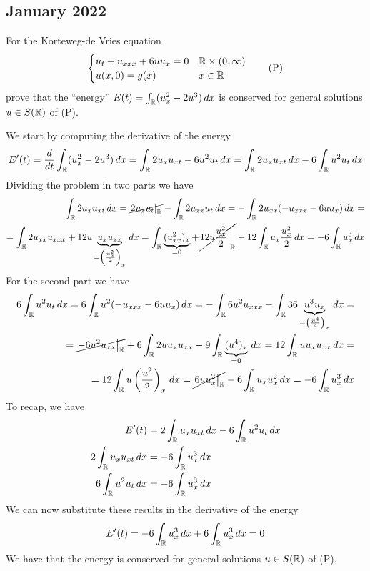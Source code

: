 \subsection{January 2022}
\begin{exercise}
    For the Korteweg-de Vries equation
    \[
        \begin{cases}
            u_t + u_{xxx} + 6 u u_x = 0 & \mathbb{R} \times (0, \infty) \\
            u(x, 0) = g(x) & x \in \mathbb{R}
        \end{cases}
        \tag*{(P)}
    \]
    prove that the ``energy'' \(E(t) = \int_{\mathbb{R}} (u_x^2 - 2 u^3) \, dx\) is conserved for general solutions \(u \in S(\mathbb{R})\) of (P).
\end{exercise}
We start by computing the derivative of the energy
\[
    \begin{split}
        E'(t) = \frac{d}{dt} \int_{\mathbb{R}} (u_x^2 - 2 u^3) \, dx = \int_{\mathbb{R}} 2 u_x u_{xt} - 6 u^2 u_t \, dx = \int_{\mathbb{R}} 2 u_x u_{xt} \, dx - 6 \int_{\mathbb{R}} u^2 u_t \, dx
    \end{split}
\]
Dividing the problem in two parts we have
\[
    \begin{split}
        \int_{\mathbb{R}} 2 u_x u_{xt} \, dx = \cancel{\left.2 u_x u_t \right|_{\mathbb{R}}} - \int_{\mathbb{R}} 2u_{xx} u_t \, dx = - \int_{\mathbb{R}} 2u_{xx} ( - u_{xxx} - 6 u u_x) \, dx = \\
        = \int_{\mathbb{R}} 2u_{xx} u_{xxx} + 12 u \underbrace{u_x u_{xx}}_{=\left(\frac{u_x^2}{2}\right)_x} \, dx = \int_{\mathbb{R}} \underbrace{(u_{xx}^2)_x}_{=0} + \cancel{\left. 12 u \frac{u_x^2}{2} \right|_{\mathbb{R}}} - 12 \int_{\mathbb{R}} u_x \frac{u_x^2}{2} \, dx = - 6 \int_{\mathbb{R}} u_x^3 \, dx
    \end{split}
\]
For the second part we have
\[
    \begin{split}
        6 \int_{\mathbb{R}} u^2 u_t \, dx = 6 \int_{\mathbb{R}} u^2 (-u_{xxx} - 6 u u_x) \, dx = -\int_{\mathbb{R}} 6 u^2 u_{xxx} - \int_{\mathbb{R}} 36 \underbrace{u^3 u_x}_{=\left(\frac{u^4}{4}\right)_x} \, dx = \\ 
        = \cancel{\left. - 6 u^2 u_{xx} \right|_{\mathbb{R}}} + 6 \int_{\mathbb{R}} 2 u u_{x} u_{xx} - 9 \int_{\mathbb{R}} \underbrace{(u^4)_x}_{=0} \, dx = 12 \int_{\mathbb{R}} u u_x u_{xx} \, dx = \\
        =12 \int_{\mathbb{R}} u\left(\frac{u^2}{2}\right)_x \, dx = \cancel{\left. 6 u u_x^2 \right|_{\mathbb{R}}} - 6 \int_{\mathbb{R}} u_x u^2_x \, dx = - 6 \int_{\mathbb{R}} u_x^3 \, dx
    \end{split}
\]
To recap, we have
\begin{align*}
    E'(t) &= 2\int_{\mathbb{R}} u_x u_{xt} \, dx - 6 \int_{\mathbb{R}} u^2 u_t \, dx  \\
    2\int_{\mathbb{R}}  u_x u_{xt} \, dx &= - 6 \int_{\mathbb{R}} u_x^3 \, dx \\
    6\int_{\mathbb{R}}  u^2 u_t \, dx &= - 6 \int_{\mathbb{R}} u_x^3 \, dx
\end{align*} 
We can now substitute these results in the derivative of the energy
\[
    \begin{split}
        E'(t) = - 6 \int_{\mathbb{R}} u_x^3 \, dx + 6 \int_{\mathbb{R}} u_x^3 \, dx = 0
    \end{split}
\]
We have that the energy is conserved for general solutions \(u \in S(\mathbb{R})\) of (P).

